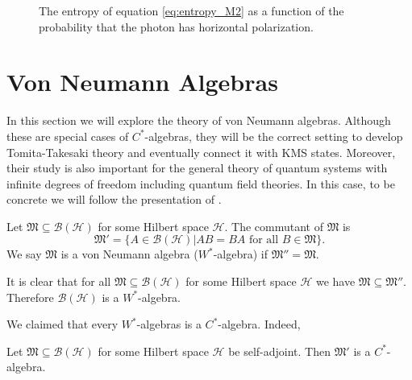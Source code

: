 \begin{example}
\begin{figure}
\caption{The entropy of equation \ref{eq:entropy_M2} as a function of the probability that the photon has horizontal polarization.}
\end{figure}
\end{example}

\section{Von Neumann Algebras}

In this section we will explore the theory of von Neumann algebras. Although these are special cases of $C^*$-algebras, they will be the correct setting to develop Tomita-Takesaki theory and eventually connect it with KMS states. Moreover, their study is also important for the general theory of quantum systems with infinite degrees of freedom including quantum field theories\cite{Haag1992}. In this case, to be concrete we will follow the presentation of \cite{ Evans1998}. 

\begin{definition}
Let $\mathfrak{M}\subseteq \mathcal{B}({\mathcal{H}})$ for some Hilbert space $\mathcal{H}$. The commutant of $\mathfrak{M}$ is
\begin{equation}
\mathfrak{M}'=\{A\in\mathcal{B}(\mathcal{H})|AB=BA\text{ for all } B\in\mathfrak{M}\}.
\end{equation}
We say $\mathfrak{M}$ is a von Neumann algebra ($W^*$-algebra) if $\mathfrak{M}''=\mathfrak{M}$.
\end{definition}

\begin{example}
It is clear that for all $\mathfrak{M}\subseteq\mathcal{B}(\mathcal{H})$ for some Hilbert space $\mathcal{H}$ we have $\mathfrak{M}\subseteq\mathfrak{M}''$. Therefore $\mathcal{B}(\mathcal{H})$ is a $W^*$-algebra.
\end{example}

We claimed that every $W^*$-algebras is a $C^*$-algebra. Indeed,

\begin{theorem}
Let $\mathfrak{M}\subseteq \mathcal{B}({\mathcal{H}})$ for some Hilbert space $\mathcal{H}$ be self-adjoint. Then $\mathfrak{M}'$ is a $C^*$-algebra.
\end{theorem}

